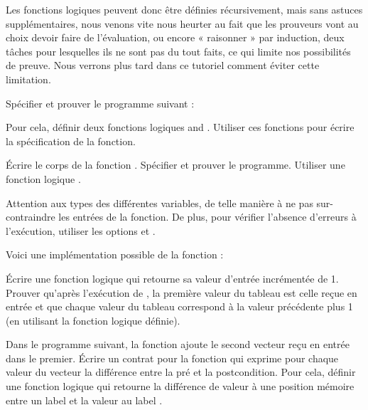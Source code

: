 Les fonctions logiques peuvent donc être définies récursivement, mais sans astuces
supplémentaires, nous venons vite nous heurter au fait que les prouveurs vont au
choix devoir faire de l'évaluation, ou encore « raisonner » par induction, deux
tâches pour lesquelles ils ne sont pas du tout faits, ce qui limite nos
possibilités de preuve. Nous verrons plus tard dans ce tutoriel comment éviter
cette limitation.






Spécifier et prouver le programme suivant :




Pour cela, définir deux fonctions logiques  and .
Utiliser ces fonctions pour écrire la spécification de la fonction.




Écrire le corps de la fonction . Spécifier et prouver le
programme. Utiliser une fonction logique .




Attention aux types des différentes variables, de telle manière à ne pas
sur-contraindre les entrées de la fonction. De plus, pour vérifier l'absence
d'erreurs à l'exécution, utiliser les options 
et .




Voici une implémentation possible de la fonction  :




Écrire une fonction logique qui retourne sa valeur d'entrée incrémentée de 1.
Prouver qu'après l'exécution de , la première valeur du tableau
est celle reçue en entrée et que chaque valeur du tableau correspond à la valeur
précédente plus 1 (en utilisant la fonction logique définie).






Dans le programme suivant, la fonction  ajoute le second
vecteur reçu en entrée dans le premier. Écrire un contrat pour la fonction
 qui exprime pour chaque valeur du vecteur
 la différence entre la pré et la postcondition. Pour cela,
définir une fonction logique  qui retourne la différence de
valeur à une position mémoire entre un label  et la valeur au
label .



